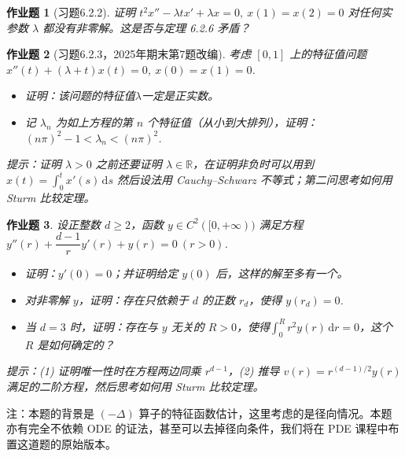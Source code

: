 \documentclass[UTF8,fontset=windows,12pt]{ctexart}
\theoremstyle{kaiti-theorem}
\newtheorem{problem}{作业题}
\numberwithin{equation}{section}
\newcommand{\R}{\mathbb{R}}
\newcommand{\lap}{\Delta}
\newcommand{\dr}{\,\mathrm{d}r}
\newcommand{\ds}{\,\mathrm{d}s}
\newcommand{\lam}{\lambda}
\begin{document}
\begin{problem}[习题6.2.2]
证明 \(t^{2}x''-\lambda tx'+\lambda x=0,~ x(1)=x(2)=0\) 对任何实参数 $\lambda$ 都没有非零解。这是否与定理 6.2.6 矛盾？
\end{problem}

\begin{problem}[习题6.2.3，2025年期末第7题改编]
考虑 $[0,1]$ 上的特征值问题 $x''(t)+(\lam+t)x(t)=0$, $x(0)=x(1)=0$. 
\begin{itemize}
\item [(1)] 证明：该问题的特征值$\lam$一定是正实数。
\item [(2)] 记 \(\lambda_n\) 为如上方程的第 \(n\) 个特征值（从小到大排列），证明：\((n\pi)^2-1<\lambda_n<(n\pi)^2\).
\end{itemize}

提示：证明 $\lam> 0$ 之前还要证明 $\lam\in\R$，在证明非负时可以用到 $\displaystyle x(t)=\int_0^t x'(s)\ds$ 然后设法用 Cauchy--Schwarz 不等式；第二问思考如何用 Sturm 比较定理。
\end{problem}

\begin{problem}
设正整数 $d\geqslant 2$，函数 $y\in C^2([0,+\infty))$ 满足方程 $y''(r)+\dfrac{d-1}{r}y'(r)+y(r)=0~(r>0)$. 
\begin{itemize}
\item [(1)] 证明：$y'(0)=0$；并证明给定 \(y(0)\) 后，这样的解至多有一个。
\item [(2)] 对非零解 \(y\)，证明：存在只依赖于 \(d\) 的正数 \(r_d\)，使得 $y(r_d)=0$.
\item [(3)] 当 $d=3$ 时，证明：存在与 \(y\) 无关的 \(R>0\)，使得\(\displaystyle\int_0^R r^2y(r)\dr=0\)，这个 $R$ 是如何确定的？
\end{itemize}

提示：(1) 证明唯一性时在方程两边同乘 $r^{d-1}$，(2) 推导 $v(r)=r^{(d-1)/2}y(r)$ 满足的二阶方程，然后思考如何用 Sturm 比较定理。
\end{problem}
注：本题的背景是 $(-\lap)$ 算子的特征函数估计，这里考虑的是径向情况。本题亦有完全不依赖 ODE 的证法，甚至可以去掉径向条件，我们将在 PDE 课程中布置这道题的原始版本。
\end{document}
